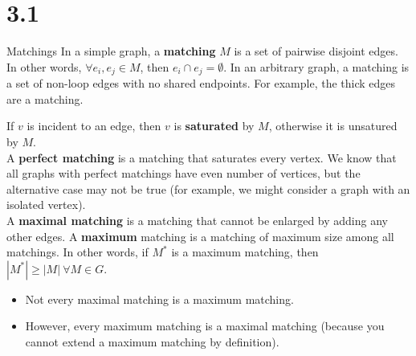 \documentclass[10pt]{extarticle}
\begin{document}
  \section*{3.1}%
  \begin{problem}{Matchings}
    In a simple graph, a \textbf{matching} $M$ is a set of pairwise disjoint edges. In other words, $\forall e_i,e_j\in M$, then $e_i\cap e_j = \emptyset$. In an arbitrary graph, a matching is a set of non-loop edges with no shared endpoints. For example, the thick edges are a matching.
    \begin{center}
    \end{center}
    If $v$ is incident to an edge, then $v$ is \textbf{saturated} by $M$, otherwise it is unsatured by $M$.\\

    A \textbf{perfect matching} is a matching that saturates every vertex. We know that all graphs with perfect matchings have even number of vertices, but the alternative case may not be true (for example, we might consider a graph with an isolated vertex).\\

    A \textbf{maximal matching} is a matching that cannot be enlarged by adding any other edges. A \textbf{maximum} matching is a matching of maximum size among all matchings. In other words, if $M^*$ is a maximum matching, then $|M^*| \geq |M|~\forall M\in G$.
    \begin{itemize}
      \item Not every maximal matching is a maximum matching.
      \item However, every maximum matching is a maximal matching (because you cannot extend a maximum matching by definition).
    \end{itemize}
  \end{problem}
\end{document}
